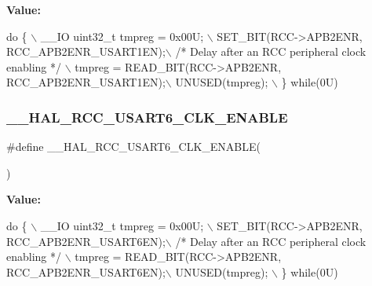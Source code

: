 {\bfseries Value\+:}
\begin{DoxyCode}
\textcolor{keywordflow}{do} \{ \(\backslash\)
                                        \_\_IO uint32\_t tmpreg = 0x00U; \(\backslash\)
                                        SET\_BIT(RCC->APB2ENR, RCC\_APB2ENR\_USART1EN);\(\backslash\)
                                        \textcolor{comment}{/* Delay after an RCC peripheral clock enabling */} \(\backslash\)
                                        tmpreg = READ\_BIT(RCC->APB2ENR, RCC\_APB2ENR\_USART1EN);\(\backslash\)
                                        UNUSED(tmpreg); \(\backslash\)
                                          \} \textcolor{keywordflow}{while}(0U)
\end{DoxyCode}
\mbox{\label{group___r_c_c___a_p_b2___clock___enable___disable_ga840be8a915492c85d968faec688c73ea}} 
\subsubsection{\texorpdfstring{\+\_\+\+\_\+\+H\+A\+L\+\_\+\+R\+C\+C\+\_\+\+U\+S\+A\+R\+T6\+\_\+\+C\+L\+K\+\_\+\+E\+N\+A\+B\+LE}{\_\_HAL\_RCC\_USART6\_CLK\_ENABLE}}
{\footnotesize\ttfamily \#define \+\_\+\+\_\+\+H\+A\+L\+\_\+\+R\+C\+C\+\_\+\+U\+S\+A\+R\+T6\+\_\+\+C\+L\+K\+\_\+\+E\+N\+A\+B\+LE(\begin{DoxyParamCaption}{ }\end{DoxyParamCaption})}

{\bfseries Value\+:}
\begin{DoxyCode}
\textcolor{keywordflow}{do} \{ \(\backslash\)
                                        \_\_IO uint32\_t tmpreg = 0x00U; \(\backslash\)
                                        SET\_BIT(RCC->APB2ENR, RCC\_APB2ENR\_USART6EN);\(\backslash\)
                                        \textcolor{comment}{/* Delay after an RCC peripheral clock enabling */} \(\backslash\)
                                        tmpreg = READ\_BIT(RCC->APB2ENR, RCC\_APB2ENR\_USART6EN);\(\backslash\)
                                        UNUSED(tmpreg); \(\backslash\)
                                          \} \textcolor{keywordflow}{while}(0U)
\end{DoxyCode}
